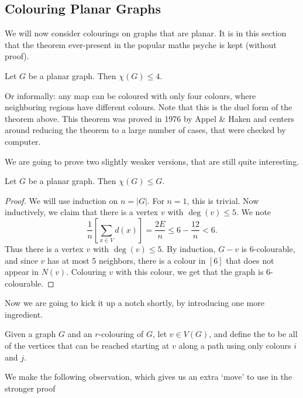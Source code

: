 \subsection{Colouring Planar Graphs}

We will now consider colourings on graphs that are planar. It is in this section that the theorem ever-present in the popular maths psyche is kept (without proof).

\begin{theorem}
	Let $G$ be a planar graph. Then $\chi(G) \leq 4$.
\end{theorem}

Or informally: any map can be coloured with only four colours, where neighboring regions have different colours. Note that this is the duel form of the theorem above.
This theorem was proved in 1976 by Appel \& Haken and centers around reducing the theorem to a large number of cases, that were checked by computer.

We are going to prove two slightly weaker versions, that are still quite interesting.

\begin{theorem}
Let $G$ be a planar graph. Then $\chi(G) \leq G$.
\end{theorem}
\begin{proof}
	We will use induction on $n = |G|$. For $n = 1$, this is trivial.
	Now inductively, we claim that there is a vertex $v$ with $\deg(v) \leq 5$. We note
	$$
	\frac{1}{n}\left[\sum_{x \in V} d(x)\right] = \frac{2E}{n} \leq 6 - \frac{12}{n} < 6.
	$$
	Thus there is a vertex $v$ with $\deg(v) \leq 5$. By induction, $G - v$ is 6-colourable, and since $v$ has at most 5 neighbors, there is a colour in $[6]$ that does not appear in $N(v)$. Colouring $v$ with this colour, we get that the graph is 6-colourable.
\end{proof}

Now we are going to kick it up a notch shortly, by introducing one more ingredient.

\begin{definition}
	Given a graph $G$ and an $r$-colouring of $G$, let $v \in V(G)$, and define the  to be all of the vertices that can be reached starting at $v$ along a path using only colours $i$ and $j$.
\end{definition}

We make the following observation, which gives us an extra `move' to use in the stronger proof

